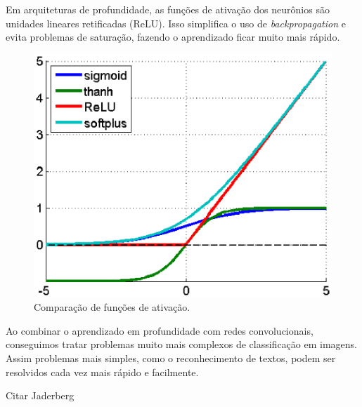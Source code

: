 Em arquiteturas de profundidade, as funções de ativação dos neurônios
são unidades lineares retificadas (ReLU). Isso simplifica o uso de
\textit{backpropagation} e evita problemas de saturação, fazendo o
aprendizado ficar muito mais rápido.

\begin{figure}[H]
\centering
\includegraphics[scale=0.6]{imagens/activation_funcs.eps}
\caption{Comparação de funções de ativação.}
\label{fig:activation_funcs}
\end{figure}

Ao combinar o aprendizado em profundidade com redes convolucionais,
conseguimos tratar problemas muito mais complexos de classificação em
imagens. Assim problemas mais simples, como o reconhecimento de
textos, podem ser resolvidos cada vez mais rápido e facilmente.



Citar Jaderberg\cite{Jaderberg}
